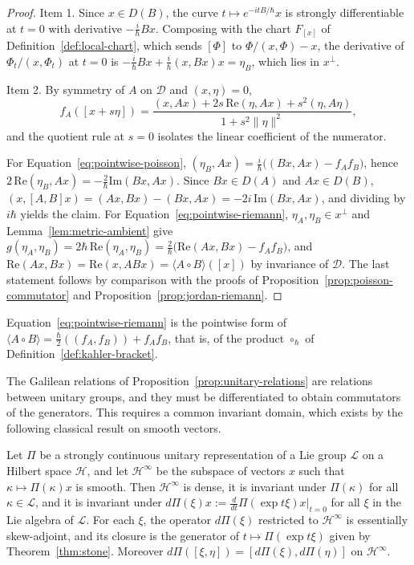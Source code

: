\begin{proof}
	Item 1. Since $x\in D(B)$, the curve $t\mapsto e^{-itB/\hbar}x$ is strongly differentiable at $t=0$ with derivative $-\tfrac{i}{\hbar}Bx$. Composing with the chart $F_{[x]}$ of Definition~\ref{def:local-chart}, which sends $[\Phi]$ to $\Phi/(x,\Phi)-x$, the derivative of $\Phi_t/(x,\Phi_t)$ at $t=0$ is $-\tfrac{i}{\hbar}Bx+\tfrac{i}{\hbar}(x,Bx)x=\eta_B$, which lies in $x^\perp$.
	
	Item 2. By symmetry of $A$ on $\mathcal{D}$ and $(x,\eta)=0$,
	\begin{equation*}
		f_A([x+s\eta])=\frac{(x,Ax)+2s\,\mathrm{Re}(\eta,Ax)+s^2(\eta,A\eta)}{1+s^2\|\eta\|^2},
	\end{equation*}
	and the quotient rule at $s=0$ isolates the linear coefficient of the numerator.
	
	For Equation~\eqref{eq:pointwise-poisson}, $(\eta_B,Ax)=\tfrac{i}{\hbar}\big((Bx,Ax)-f_Af_B\big)$, hence $2\,\mathrm{Re}(\eta_B,Ax)=-\tfrac{2}{\hbar}\mathrm{Im}(Bx,Ax)$. Since $Bx\in D(A)$ and $Ax\in D(B)$, $(x,[A,B]x)=(Ax,Bx)-(Bx,Ax)=-2i\,\mathrm{Im}(Bx,Ax)$, and dividing by $i\hbar$ yields the claim. For Equation~\eqref{eq:pointwise-riemann}, $\eta_A,\eta_B\in x^\perp$ and Lemma~\ref{lem:metric-ambient} give $g(\eta_A,\eta_B)=2\hbar\,\mathrm{Re}(\eta_A,\eta_B)=\tfrac{2}{\hbar}\big(\mathrm{Re}(Ax,Bx)-f_Af_B\big)$, and $\mathrm{Re}(Ax,Bx)=\mathrm{Re}(x,ABx)=\langle A\circ B\rangle([x])$ by invariance of $\mathcal{D}$. The last statement follows by comparison with the proofs of Proposition~\ref{prop:poisson-commutator} and Proposition~\ref{prop:jordan-riemann}.
\end{proof}

\noindent Equation~\eqref{eq:pointwise-riemann} is the pointwise form of $\langle A\circ B\rangle=\tfrac{\hbar}{2}((f_A,f_B))+f_Af_B$, that is, of the product $\circ_{\hbar}$ of Definition~\ref{def:kahler-bracket}.

The Galilean relations of Proposition~\ref{prop:unitary-relations} are relations between unitary groups, and they must be differentiated to obtain commutators of the generators. This requires a common invariant domain, which exists by the following classical result on smooth vectors.

\begin{theorem}\label{thm:smooth-vectors}
	Let $\Pi$ be a strongly continuous unitary representation of a Lie group $\mathcal{L}$ on a Hilbert space $\mathcal{H}$, and let $\mathcal{H}^\infty$ be the subspace of vectors $x$ such that $\kappa\mapsto\Pi(\kappa)x$ is smooth. Then $\mathcal{H}^\infty$ is dense, it is invariant under $\Pi(\kappa)$ for all $\kappa\in\mathcal{L}$, and it is invariant under $d\Pi(\xi)x:=\frac{d}{dt}\Pi(\exp t\xi)x\big|_{t=0}$ for all $\xi$ in the Lie algebra of $\mathcal{L}$. For each $\xi$, the operator $d\Pi(\xi)$ restricted to $\mathcal{H}^\infty$ is essentially skew-adjoint, and its closure is the generator of $t\mapsto\Pi(\exp t\xi)$ given by Theorem~\ref{thm:stone}. Moreover $d\Pi([\xi,\eta])=[d\Pi(\xi),d\Pi(\eta)]$ on $\mathcal{H}^\infty$.
\end{theorem}

